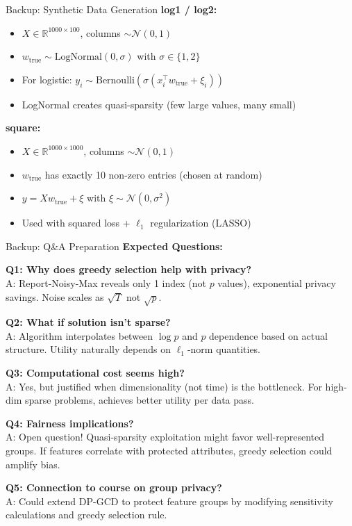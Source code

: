 \documentclass[10pt]{beamer}
\begin{document}
\begin{frame}{Backup: Synthetic Data Generation}
\textbf{log1 / log2:}
\begin{itemize}
\item $X \in \mathbb{R}^{1000 \times 100}$, columns $\sim \mathcal{N}(0, 1)$
\item $w_{\text{true}} \sim \text{LogNormal}(0, \sigma)$ with $\sigma \in \{1, 2\}$
\item For logistic: $y_i \sim \text{Bernoulli}(\sigma(x_i^\top w_{\text{true}} + \xi_i))$
\item LogNormal creates quasi-sparsity (few large values, many small)
\end{itemize}

\vspace{1em}
\textbf{square:}
\begin{itemize}
\item $X \in \mathbb{R}^{1000 \times 1000}$, columns $\sim \mathcal{N}(0, 1)$
\item $w_{\text{true}}$ has exactly 10 non-zero entries (chosen at random)
\item $y = X w_{\text{true}} + \xi$ with $\xi \sim \mathcal{N}(0, \sigma^2)$
\item Used with squared loss + $\ell_1$ regularization (LASSO)
\end{itemize}
\end{frame}

\begin{frame}{Backup: Q\&A Preparation}
\textbf{Expected Questions:}

\vspace{0.5em}
\textbf{Q1: Why does greedy selection help with privacy?}\\
A: Report-Noisy-Max reveals only 1 index (not $p$ values), exponential privacy savings. Noise scales as $\sqrt{T}$ not $\sqrt{p}$.

\vspace{0.5em}
\textbf{Q2: What if solution isn't sparse?}\\
A: Algorithm interpolates between $\log p$ and $p$ dependence based on actual structure. Utility naturally depends on $\ell_1$-norm quantities.

\vspace{0.5em}
\textbf{Q3: Computational cost seems high?}\\
A: Yes, but justified when dimensionality (not time) is the bottleneck. For high-dim sparse problems, achieves better utility per data pass.

\vspace{0.5em}
\textbf{Q4: Fairness implications?}\\
A: Open question! Quasi-sparsity exploitation might favor well-represented groups. If features correlate with protected attributes, greedy selection could amplify bias.

\vspace{0.5em}
\textbf{Q5: Connection to course on group privacy?}\\
A: Could extend DP-GCD to protect feature groups by modifying sensitivity calculations and greedy selection rule.
\end{frame}
\end{document}
